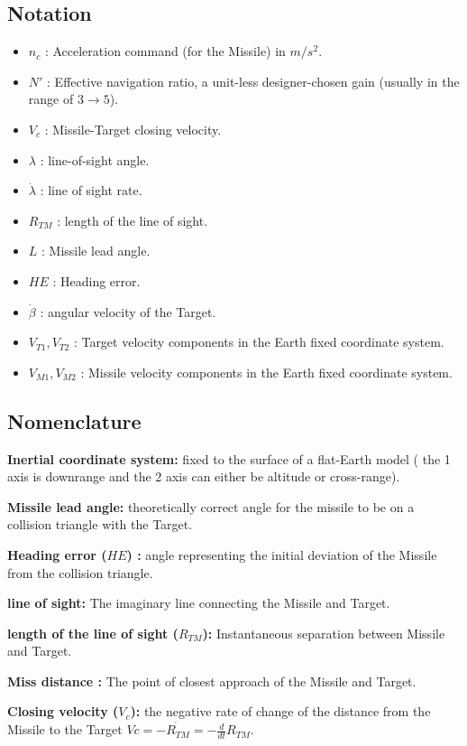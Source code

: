 \subsection*{Notation}
\begin{itemize}
	\item $n_c$ : Acceleration command (for the Missile) in $m/s^2$.
	\item $N'$ : Effective navigation ratio, a unit-less designer-chosen gain (usually in the range of $3\to5$).
	\item $V_c$ : Missile-Target closing velocity.
	\item $\lambda$ : line-of-sight angle.
	\item $\dot{\lambda}$ : line of sight rate.
	\item $R_{TM}$ : length of the line of sight.
	\item $L$ : Missile lead angle.
	\item $HE$ : Heading error.
	\item $\dot{\beta}$ : angular velocity of the Target.
	\item $V_{T1},V_{T2}$ : Target velocity components in the Earth fixed coordinate system.
	\item $V_{M1},V_{M2}$ : Missile velocity components in the Earth fixed coordinate system.
\end{itemize}
\subsection*{Nomenclature}

\textbf{Inertial coordinate system:} fixed to the surface of a flat-Earth model ( the 1 axis is downrange and the 2 axis can either be altitude or cross-range).

\textbf{Missile lead angle:} theoretically correct angle
for the missile to be on a collision triangle with the Target.

\textbf{Heading error ($HE$) :} angle representing the initial deviation of the Missile from the collision triangle.

\textbf{line of sight:} The imaginary line connecting the Missile and Target.

\textbf{length of the line of sight ($R_{TM}$):} Instantaneous separation between Missile and Target.

\textbf{Miss distance :} The point of closest approach of the Missile and Target.

\textbf{Closing velocity ($V_c$):} the negative rate of change of the distance
from the Missile to the Target $Vc= -\dot{R_{TM}}=-\frac{d}{dt} R_{TM} $.



